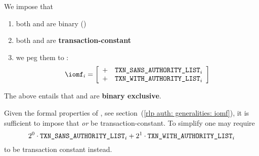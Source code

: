 We impose that
\begin{enumerate}
	\item both \transactionTypeSansAuthorityLists{} and \transactionTypeWithAuthorityLists{} are binary (\sanityCheck)
	\item both \transactionTypeSansAuthorityLists{} and \transactionTypeWithAuthorityLists{} are \textbf{transaction-constant}
	\item we peg them to \iomf{}:
		\[
			\iomf _{i}
			=
			\left[ \begin{array}{cl}
				+ & \transactionTypeSansAuthorityLists _{i} \\
				+ & \transactionTypeWithAuthorityLists _{i} \\
			\end{array} \right]
		\]
\end{enumerate}
\saNote{} \label{rlp auth: generalities: transactions with or sans authority list: exclusivity}
The above entails that
\transactionTypeSansAuthorityLists{} and
\transactionTypeWithAuthorityLists{}
are \textbf{binary exclusive}.

\saNote{}
Given the formal properties of \iomf{},
see section~(\ref{rlp auth: generalities: iomf}),
it is sufficient to impose that
\transactionTypeSansAuthorityLists{} \emph{or}
\transactionTypeWithAuthorityLists{}
be transaction-constant.
To simplify one may require
\[
	2^{0} \cdot \texttt{TXN\_SANS\_AUTHORITY\_LIST} _{i} +
	2^{1} \cdot \texttt{TXN\_WITH\_AUTHORITY\_LIST} _{i}
\]
to be transaction constant instead.
